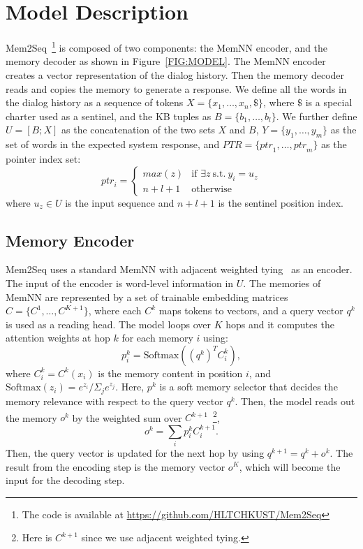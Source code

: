 \documentclass[11pt,a4paper]{article}
\begin{document}
\section{Model Description}
Mem2Seq~\footnote{The code is available at \url{https://github.com/HLTCHKUST/Mem2Seq} } is composed of two components: the MemNN encoder, and the memory decoder as shown in Figure~\ref{FIG:MODEL}.
The MemNN encoder creates a vector representation of the dialog history. Then the memory decoder reads and copies the memory to generate a response. 
We define all the words in the dialog history as a sequence of tokens $X=\{ x_1,\dots,x_n,\$\}$, where $\$$ is a special charter used as a sentinel, and the KB tuples as $B=\{ b_1,\dots,b_{l} \}$. We further define $U=[B; X]$ as the concatenation of the two sets $X$ and $B$, $Y=\{ y_1,\dots,y_m\}$ as the set of  words in the expected system response, and $PTR=\{ {ptr}_1,\dots,{ptr}_m\}$ as the pointer index set:
\begin{equation}
{ptr}_i = 
\begin{cases} 
max(z) &\mbox{if } \exists z \ \text{s.t.} \ y_i = u_z \\ 
n+l+1&\mbox{otherwise} 
\end{cases} 
\label{eq1}
\end{equation}
where $u_z\in U$ is the input sequence and $n+l+1$ is the sentinel position index. 

\subsection{Memory Encoder}
Mem2Seq uses a standard MemNN with adjacent weighted tying~\cite{sukhbaatar2015end} as an encoder. The input of the encoder is word-level information in $U$. The memories of MemNN are represented by a set of trainable embedding matrices $C = \{ C^1,\dots,C^{K+1} \}$, where each $C^k$ maps tokens to vectors, and a query vector $q^k$ is used as a reading head. The model loops over $K$ hops and it computes the attention weights at hop $k$ for each memory $i$ using:
\begin{equation}
  p^k_i = \text{Softmax}((q^k)^T C^k_i),
  \label{eq2}
\end{equation}
where $C^k_i = C^k(x_i)$ is the memory content in position $i$, and $\text{Softmax}(z_i)=e^{z_i}/\Sigma_j {e^{z_j}}$. Here, $p^k$ is a soft memory selector that decides the memory relevance with respect to the query vector $q^k$. Then, the model reads out the memory $o^k$ by the weighted sum over $C^{k+1}$~\footnote{Here is $C^{k+1}$ since we use adjacent weighted tying.},
\begin{equation}
  o^k = \sum_i p^k_i C^{k+1}_i.
  \label{eq3}
\end{equation}
Then, the query vector is updated for the next hop by using $q^{k+1} = q^{k} + o^{k}$. The result from the encoding step is the memory vector $o^K$, which will become the input for the decoding step.  
\end{document}
